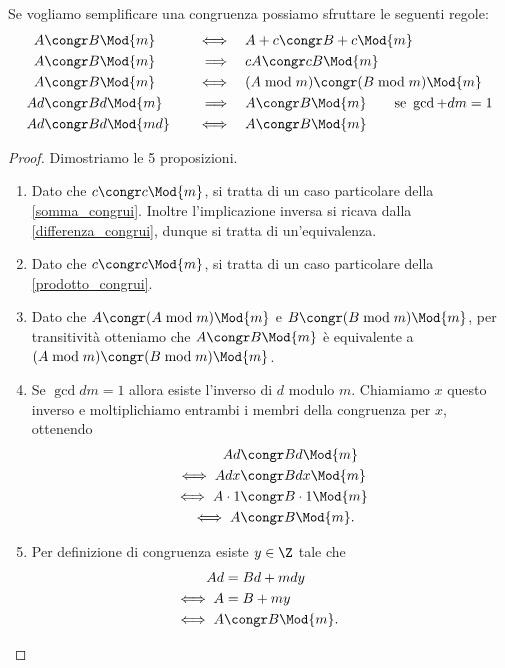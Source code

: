 \begin{proposition}
    Se vogliamo semplificare una congruenza possiamo sfruttare le seguenti regole:
    \begin{alignat}{3}
        A &\congr B \Mod{m} \quad &\iff      \quad &A + c \congr B + c \Mod{m} \\
        A &\congr B \Mod{m} \quad &\implies  \quad &cA \congr cB \Mod{m} \\
        A &\congr B \Mod{m} \quad &\iff      \quad &(A \bmod m) \congr (B \bmod m) \Mod{m} \\
        Ad &\congr Bd \Mod{m} \quad &\implies\quad &A \congr B \Mod{m} \qquad \text{se }\gcd{d}{m} = 1\\
        Ad &\congr Bd \Mod{md} \quad &\iff   \quad &A \congr B \Mod{m}
    \end{alignat}
\end{proposition}
\begin{proof}
    Dimostriamo le 5 proposizioni.
    \begin{enumerate}
        \item Dato che $c \congr c \Mod{m}$, si tratta di un caso particolare della \ref{somma_congrui}. Inoltre l'implicazione inversa si ricava dalla \ref{differenza_congrui}, dunque si tratta di un'equivalenza.
        \item Dato che $c \congr c \Mod{m}$, si tratta di un caso particolare della \ref{prodotto_congrui}.
        \item Dato che $A \congr (A \bmod m) \Mod{m}$ e $B \congr (B \bmod m) \Mod{m}$, per transitività otteniamo che $A \congr B \Mod{m}$ è equivalente a $(A \bmod m) \congr (B \bmod m) \Mod{m}$.
        \item Se $\gcd{d}{m} = 1$ allora esiste l'inverso di $d$ modulo $m$. Chiamiamo $x$ questo inverso e moltiplichiamo entrambi i membri della congruenza per $x$, ottenendo
        \begin{alignat*}
            {1}
            Ad &\congr Bd \Mod{m}  \\
            \iff Adx &\congr Bdx \Mod{m} \\
            \iff A \cdot 1 &\congr B \cdot 1 \Mod{m} \\
            \iff A &\congr B \Mod{m}.
        \end{alignat*}
        \item Per definizione di congruenza esiste $y \in \Z$ tale che
        \begin{alignat*}
            {1}
            Ad &= Bd + mdy \\
            \iff A &= B + my \\
            \iff A &\congr B \Mod{m}. \tag*{\qedhere}
        \end{alignat*}
    \end{enumerate}
\end{proof}

